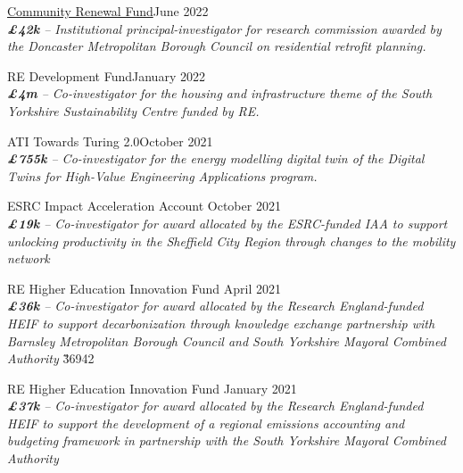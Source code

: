 \documentclass[10pt]{article}
\newcommand{\blankline}{\quad\pagebreak[3]}
\begin{document}
\href{}{Community Renewal Fund}\hfill {June 2022}\\
\emph{\textbf{\pounds42k} -- Institutional principal-investigator for research commission awarded by the Doncaster Metropolitan Borough Council on residential retrofit planning.}
\FPset{}
\FPset{}

%

\blankline

RE Development Fund\hfill {January 2022}\\
\emph{\textbf{\pounds4m} -- Co-investigator for the housing and infrastructure theme of the South Yorkshire Sustainability Centre funded by RE.}
\FPset{}
\FPset{}

\blankline

ATI Towards Turing 2.0\hfill {October 2021}\\
\emph{\textbf{\pounds755k} -- Co-investigator for the energy modelling digital twin of the Digital Twins for High-Value Engineering Applications program.}
\FPset{}
\FPset{}

\blankline

ESRC Impact Acceleration Account \hfill {October 2021}\\
\emph{\textbf{\pounds19k} -- Co-investigator for award allocated by the ESRC-funded IAA to support unlocking productivity in the Sheffield City Region through changes to the	mobility network}
\FPset{}
\FPset{}

\blankline

RE Higher Education Innovation Fund \hfill {April 2021}\\
\emph{\textbf{\pounds36k} -- Co-investigator for award allocated by the Research England-funded HEIF to support decarbonization through knowledge exchange partnership with Barnsley Metropolitan Borough Council and South Yorkshire Mayoral Combined Authority}
\FPset\v{36942}
\FPset{}

\blankline

RE Higher Education Innovation Fund \hfill {January 2021}\\
\emph{\textbf{\pounds37k} -- Co-investigator for award allocated by the Research England-funded HEIF to support the development of a regional emissions accounting and budgeting framework in partnership with the South Yorkshire Mayoral Combined Authority}
\FPset{}
\FPset{}
\end{document}

